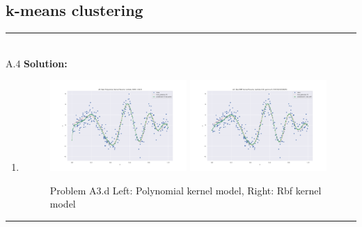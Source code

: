 \documentclass{article}
\newcommand{\1}{\mathbf{1}}
\begin{document}
\subsection*{k-means clustering}
\noindent\rule{\textwidth}{1pt}
\\
A.4 {\bf Solution:}\\
\begin{enumerate}
    \item \begin{figure}[h!]
            \centering
            \includegraphics[width=0.49\textwidth]{hw3/code/figures/A3db_poly.pdf}
            \includegraphics[width=0.49\textwidth]{hw3/code/figures/A3db_rbf.pdf}
            \caption{Problem A3.d Left: Polynomial kernel model, Right: Rbf kernel model}
            \label{figure:a4}
        \end{figure}
\end{enumerate}   
\noindent\rule{\textwidth}{1pt}
\end{document}
